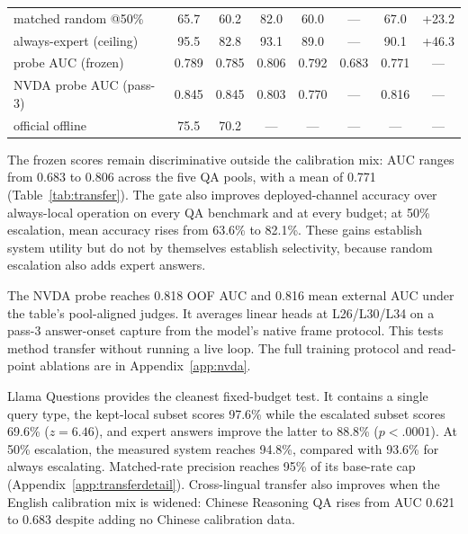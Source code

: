 \begin{table}[t]
\begin{tabular}{lccccccc}
\;matched random @50\% & 65.7 & 60.2 & 82.0 & 60.0 & --- & 67.0 & +23.2 \\
always-expert (ceiling) & 95.5 & 82.8 & 93.1 & 89.0 & --- & 90.1 & +46.3 \\
\midrule
probe AUC (frozen)    & 0.789 & 0.785 & 0.806 & 0.792 & 0.683 & 0.771 & --- \\
NVDA probe AUC (pass-3) & 0.845 & 0.845 & 0.803 & 0.770 & --- & 0.816 & --- \\
official offline      & 75.5 & 70.2 & ---  & ---  & ---  & ---  & --- \\
\bottomrule
\end{tabular}
\end{table}

The frozen scores remain discriminative outside the calibration mix:
AUC ranges from 0.683 to 0.806 across the five QA pools, with a mean of
0.771 (Table~\ref{tab:transfer}). The gate also improves
deployed-channel accuracy over always-local operation on every QA
benchmark and at every budget; at 50\% escalation, mean accuracy rises
from 63.6\% to 82.1\%. These gains establish system utility but do not
by themselves establish selectivity, because random escalation also
adds expert answers.

The NVDA probe reaches 0.818 OOF AUC and 0.816 mean external AUC under
the table's pool-aligned judges. It averages linear heads at
L26/L30/L34 on a pass-3 answer-onset capture from the model's native
frame protocol. This tests method transfer without running a live
loop. The full training protocol and read-point ablations are in
Appendix~\ref{app:nvda}.

Llama Questions provides the cleanest fixed-budget test. It contains a
single query type, the kept-local subset scores 97.6\% while the
escalated subset scores 69.6\% ($z{=}6.46$), and expert answers improve
the latter to 88.8\% ($p{<}.0001$). At 50\% escalation, the measured
system reaches 94.8\%, compared with 93.6\% for always escalating.
Matched-rate precision reaches 95\% of its base-rate cap
(Appendix~\ref{app:transferdetail}). Cross-lingual transfer also
improves when the English calibration mix is widened: Chinese
Reasoning QA rises from AUC 0.621 to 0.683 despite adding no Chinese
calibration data.

